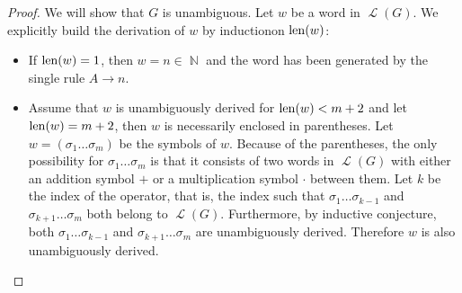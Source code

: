 \begin{proof}
  We will show that \( G \) is unambiguous. Let \( w \) be a word in \( \mscrL(G) \). We explicitly build the derivation of \( w \) by induction\IND on \( \operatorname{len}(w) \):
  \begin{itemize}
    \item If \( \operatorname{len}(w) = 1 \), then \( w = n \in \BbbN \) and the word has been generated by the single rule \( A \to n \).

    \item Assume that \( w \) is unambiguously derived for \( \operatorname{len}(w) < m + 2 \) and let \( \operatorname{len}(w) = m + 2 \), then \( w \) is necessarily enclosed in parentheses. Let \( w = ( \sigma_1 \ldots \sigma_m ) \) be the symbols of \( w \). Because of the parentheses, the only possibility for \( \sigma_1 \ldots \sigma_m \) is that it consists of two words in \( \mscrL(G) \) with either an addition symbol \( + \) or a multiplication symbol \( \cdot \) between them. Let \( k \) be the index of the operator, that is, the index such that \( \sigma_1 \ldots \sigma_{k-1} \) and \( \sigma_{k+1} \ldots \sigma_m \) both belong to \( \mscrL(G) \). Furthermore, by inductive conjecture, both \( \sigma_1 \ldots \sigma_{k-1} \) and \( \sigma_{k+1} \ldots \sigma_m \) are unambiguously derived. Therefore \( w \) is also unambiguously derived.
  \end{itemize}
\end{proof}
